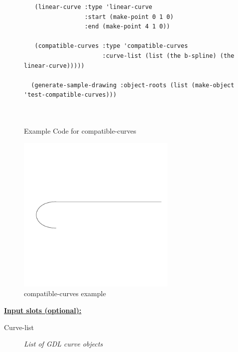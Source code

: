 \documentclass [11pt]{book}
\begin{document}
\begin{itemize}
\begin{figure}
\begin{lrbox}{\boxedverb}
\begin{minipage}{\linewidth}
{\begin{verbatim}
   (linear-curve :type 'linear-curve
                 :start (make-point 0 1 0)
                 :end (make-point 4 1 0))
   
   (compatible-curves :type 'compatible-curves
                      :curve-list (list (the b-spline) (the linear-curve)))))

  (generate-sample-drawing :object-roots (list (make-object 'test-compatible-curves)))



\end{verbatim}}
\end{minipage}
\end{lrbox}
\fbox{\usebox{\boxedverb}}

\caption{Example Code for compatible-curves}

\label{fig:example-code-compatible-curves}

\end{figure}

\begin{figure}
\begin{center}
\includegraphics[width=3in,height=3in]{../images/example-compatible-curves.pdf}
\end{center}

\caption{compatible-curves example}

\label{fig:compatible-curves}

\end{figure}





\textbf{
\underline{Input slots (optional):}}

\begin{description}

\item [Curve-list]
\emph{List of GDL curve objects}


\end{description}
\end{itemize}
\end{document}
